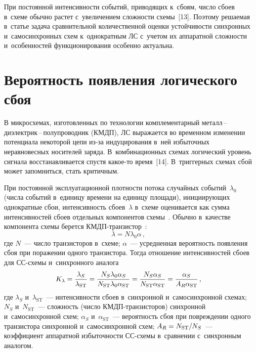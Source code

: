 \begin{multicols}{2}
  При постоянной интенсивности событий, приводящих к~сбоям, число 
сбоев в~схеме обычно рас\-тет с~увеличением сложности схемы~[13]. Поэтому 
решаемая в~статье задача сравнительной количественной оценки 
устойчивости синхронных и~самосинхронных схем к~однократным ЛС с~учетом их 
аппаратной сложности и~особенностей функционирования особенно 
актуальна.

\vspace*{-7pt}
  
\section{Вероятность появления логического сбоя}

\vspace*{-2pt}
  
  В микросхемах, изготовленных по технологии комплементарный  
ме\-талл\,--\,ди\-элект\-рик\,--\,по\-лу\-про\-вод\-ник (КМДП), ЛС выражается 
во временном изменении потенциала некоторой цепи из-за 
индуцирования в~ней избыточных неравновесных носителей заряда. 
В~комбинационных схемах логический уровень сигнала восстанавливается 
спустя ка\-кое-то время~[14]. В~триггерных схемах сбой может запомниться, 
стать критичным. 
  
  При постоянной эксплуатационной плотности потока случайных 
событий~$\lambda_0$ (числа событий в~единицу времени на единицу 
площади), инициирующих однократные сбои, интенсивность сбоев~$\lambda$ в~схеме оценивается как сумма интенсивностей сбоев отдельных компонентов 
схемы~\cite[формула~(3.11)]{13-step}. Обычно в~качестве компонента схемы 
берется КМДП-тран\-зис\-тор~\cite{12-step}:
  $$
  \lambda= N \lambda_0 \alpha\,,
  $$
где $N$~--- число транзисторов в~схеме; $\alpha$~--- усредненная вероятность 
появления сбоя при поражении одного транзистора. Тогда отношение 
интенсивностей сбоев для СС-схе\-мы и~синхронного аналога
$$
K_\lambda= \displaystyle\frac{\displaystyle \lambda_S\mathstrut}{\displaystyle \lambda_{\mathrm{ST}}\mathstrut} =\displaystyle\frac{\displaystyle N_S \lambda_0 \alpha_S\mathstrut}{\displaystyle N_{\mathrm{ST}} 
\lambda_0 \alpha_{\mathrm{ST}}\mathstrut}= \displaystyle\frac{\displaystyle N_S \alpha_S\mathstrut}{\displaystyle N_{\mathrm{ST}} \alpha_{\mathrm{ST}}\mathstrut} =\displaystyle\frac{\displaystyle \alpha_S\mathstrut}{\displaystyle A_R \alpha_{\mathrm{ST}}\mathstrut}\,,
$$
где $\lambda_S$ и~$\lambda_{\mathrm{ST}}$~--- интенсивности сбоев в~синхронной 
и~самосинхронной схе\-мах; $N_S$ и~$N_{\mathrm{ST}}$~--- слож\-ность (чис\-ло  
КМДП-тран\-зис\-то\-ров) синхронной и~самосинхронной схем; $\alpha_S$ и~$\alpha_{\mathrm{ST}}$~--- 
вероятность сбоя при повреждении одного транзистора синхронной  
и~самосинхронной схем; $A_R\hm= N_{\mathrm{ST}}/N_S$~--- коэффициент аппаратной 
избыточности СС-схе\-мы в~сравнении с~синхронным аналогом.


\end{multicols}
